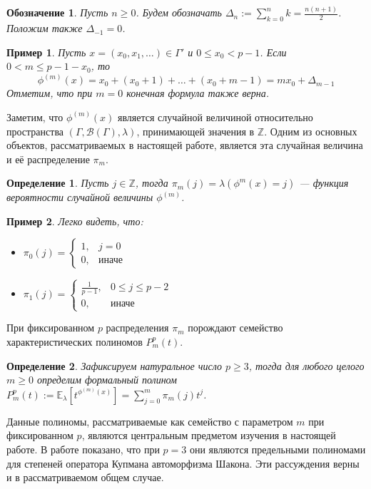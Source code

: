 \documentclass[14pt, a4paper, russian]{report}
\newtheorem{definition}{\indent Определение}
\newtheorem{example}{\indent Пример}
\newtheorem{notation}{\indent Обозначение}
\begin{document}
\begin{notation}
Пусть $n \ge 0$. Будем обозначать $\Delta_n := \sum\limits_{k=0}^{n}k = \frac{n(n+1)}{2}$. Положим также $\Delta_{-1} = 0$.
\end{notation}

\begin{example}\label{phi_delta}
Пусть $x = (x_0, x_1, \ldots) \in \Gamma'$ и $0 \le x_0 < p-1$. Если $0 < m \le p-1-x_0$, то $$\phi^{(m)}(x) = x_0 + (x_0 + 1) + \ldots + (x_0 + m - 1) = mx_0 + \Delta_{m-1}$$
Отметим, что при $m=0$ конечная формула также верна.
\end{example}

Заметим, что $\phi^{(m)}(x)$ является случайной величиной относительно пространства $(\Gamma, \mathcal{B}(\Gamma), \lambda)$, принимающей значения в $\mathbb{Z}$. Одним из основных объектов, рассматриваемых в настоящей работе, является эта случайная величина и её распределение $\pi_m$.
\begin{definition}\label{pi_m}
Пусть $j \in \mathbb{Z}$, тогда $\pi_m(j)=\lambda(\phi^{m}(x)=j)$ --- функция вероятности случайной величины $\phi^{(m)}$.
\end{definition}
\begin{example}\label{pi_example}
Легко видеть, что:
\begin{itemize}
\item $\pi_0(j) = \begin{cases}
1, & j = 0\\
0, & \text{иначе}
\end{cases}$
\item $\pi_1(j)=\begin{cases}
\frac{1}{p-1},& 0 \le j \le p-2 \\
0, & \text{иначе}
\end{cases}$
\end{itemize} 
\end{example}

При фиксированном $p$ распределения $\pi_m$ порождают семейство характеристических полиномов $P_m^p(t)$.

\begin{definition}\label{poly}
Зафиксируем натуральное число $p \ge 3$, тогда для любого целого $m \ge 0$ определим формальный полином $P_m^p(t):= \mathbb{E}_\lambda\left[ t^{\phi^{(m)}(x)}\right] = \sum\limits_{j=0}^m \pi_m(j) t^j$.
\end{definition}

Данные полиномы, рассматриваемые как семейство с параметром $m$ при фиксированном $p$, являются центральным предметом изучения в настоящей работе. В работе \cite{weaklimits} показано, что при $p=3$ они являются предельными полиномами для степеней оператора Купмана автоморфизма Шакона. Эти рассуждения верны и в рассматриваемом общем случае.
\end{document}
